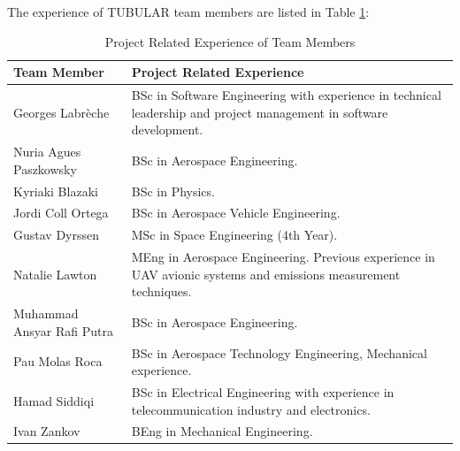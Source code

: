 \documentclass[a4paper,12pt,twoside]{article}
\begin{document}
\begin{table}[H]
\centering
{}
\caption{Project Divisions and Members (Asterisks Denote Division Leaders)}
\label{tab:divisions-members}
\end{table}
\raggedbottom

The experience of TUBULAR team members are listed in Table \ref{tab:team-member-experience}:

\begin{table}[H]
\centering
\begin{tabular}{|l|m{11cm}|}
\hline
\textbf{Team Member} & \textbf{Project Related Experience} \\ \hline
Georges Labrèche & BSc in Software Engineering with experience in technical leadership and project management in software development.\\ \hline
Nuria Agues Paszkowsky & BSc in Aerospace Engineering.\\ \hline
Kyriaki Blazaki & BSc in Physics. \\ \hline
Jordi Coll Ortega &  BSc in Aerospace Vehicle Engineering. \\ \hline
Gustav Dyrssen &  MSc in Space Engineering (4th Year).\\ \hline
Natalie Lawton & MEng in Aerospace Engineering. Previous experience in UAV avionic systems and emissions measurement techniques. \\ \hline
Muhammad Ansyar Rafi Putra & BSc in Aerospace Engineering. \\ \hline
Pau Molas Roca & BSc in Aerospace Technology Engineering, Mechanical experience. \\ \hline
Hamad Siddiqi & BSc in Electrical Engineering with experience in telecommunication industry and electronics.  \\ \hline
Ivan Zankov & BEng in Mechanical Engineering.\\ \hline
\end{tabular}
\caption{Project Related Experience of Team Members}
\label{tab:team-member-experience}
\end{table}
\raggedbottom
\end{document}
